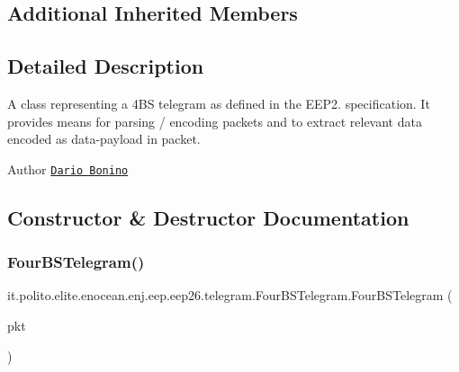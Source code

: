\subsection*{Additional Inherited Members}


\subsection{Detailed Description}
A class representing a 4\+BS telegram as defined in the E\+E\+P2. specification. It provides means for parsing / encoding packets and to extract relevant data encoded as data-\/payload in packet.

\begin{DoxyAuthor}{Author}
\href{mailto:dario.bonino@gmail.com}{\tt Dario Bonino} 
\end{DoxyAuthor}


\subsection{Constructor \& Destructor Documentation}
\hypertarget{classit_1_1polito_1_1elite_1_1enocean_1_1enj_1_1eep_1_1eep26_1_1telegram_1_1_four_b_s_telegram_ac1cce7be08a0f8e50b5e3af868ee8bbe}{}\label{classit_1_1polito_1_1elite_1_1enocean_1_1enj_1_1eep_1_1eep26_1_1telegram_1_1_four_b_s_telegram_ac1cce7be08a0f8e50b5e3af868ee8bbe} 
\subsubsection{\texorpdfstring{Four\+B\+S\+Telegram()}{FourBSTelegram()}}
{\footnotesize\ttfamily it.\+polito.\+elite.\+enocean.\+enj.\+eep.\+eep26.\+telegram.\+Four\+B\+S\+Telegram.\+Four\+B\+S\+Telegram (\begin{DoxyParamCaption}\item[{\hyperlink{classit_1_1polito_1_1elite_1_1enocean_1_1protocol_1_1serial_1_1v3_1_1network_1_1packet_1_1_e_s_p3_packet}{E\+S\+P3\+Packet}}]{pkt }\end{DoxyParamCaption})}

